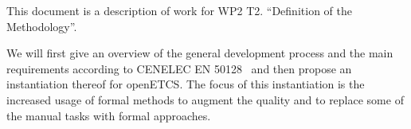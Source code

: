 
This document is a description of work for WP2 T2. ``Definition of the
Methodology''.

We will first give an overview of the general development process and the main
requirements according to CENELEC EN 50128~\cite{EN-50128} and then propose an
instantiation thereof for openETCS. The focus of this instantiation is the
increased usage of formal methods to augment the quality and to replace some of
the manual tasks with formal approaches.

